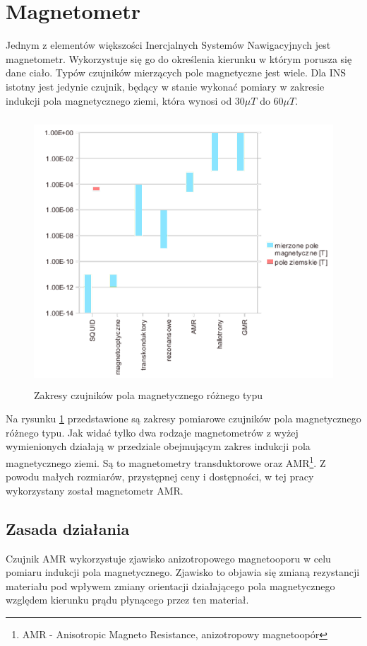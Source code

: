 \section{Magnetometr}
\label{sec:mag}
Jednym z elementów większości Inercjalnych Systemów Nawigacyjnych jest
magnetometr. Wykorzystuje się go do określenia kierunku w którym porusza się dane
ciało. Typów czujników mierzących pole magnetyczne jest wiele. Dla INS istotny
jest jedynie czujnik, będący w stanie wykonać pomiary w zakresie indukcji pola
magnetycznego ziemi, która wynosi od $30\mu T$ do $60\mu T$.
\\

\begin{figure}[!ht]
 \centering
 \includegraphics[height=100mm]{../images/ch04/magnetic_sens_types.png}
 \caption{Zakresy czujników pola magnetycznego różnego typu \cite{WstepnyProjektModuluIMU}}
 \label{fig:WykresMagnet}
\end{figure}

Na rysunku \ref{fig:WykresMagnet} przedstawione są zakresy pomiarowe czujników
pola magnetycznego różnego typu. Jak widać tylko dwa rodzaje magnetometrów z
wyżej wymienionych działają w przedziale obejmującym zakres indukcji pola
magnetycznego ziemi. Są to magnetometry transduktorowe oraz AMR\footnote{AMR -
Anisotropic Magneto Resistance, anizotropowy magnetoopór}. Z powodu małych
rozmiarów, przystępnej ceny i dostępności, w tej pracy wykorzystany został
magnetometr AMR.
\\

\subsection{Zasada działania}
Czujnik AMR wykorzystuje zjawisko anizotropowego magnetooporu w celu pomiaru indukcji pola magnetycznego. Zjawisko to objawia się zmianą rezystancji materiału pod wpływem zmiany orientacji działającego pola magnetycznego względem kierunku prądu płynącego przez ten materiał.
\\

